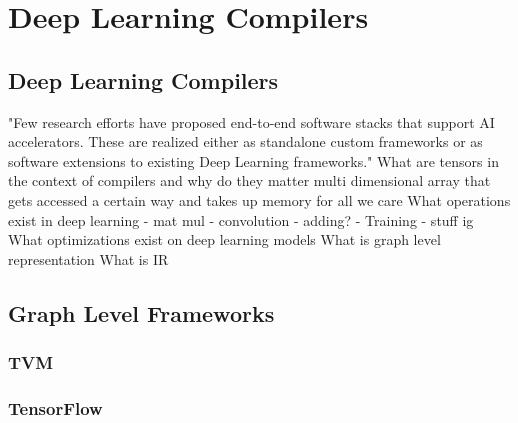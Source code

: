 
\chapter{Deep Learning Compilers} %

\label{Chapter2} %

\section{Deep Learning Compilers}

"Few research efforts have proposed end-to-end software stacks that support AI accelerators. 
These are realized either as standalone custom frameworks or as software extensions to existing Deep Learning
frameworks." \cite{onsram}
What are tensors in the context of compilers and why do they matter
	multi dimensional array that gets accessed a certain way and takes up memory for all we care
What operations exist in deep learning
- mat mul
- convolution
- adding?
- Training
- stuff ig
What optimizations exist on deep learning models
What is graph level representation
What is IR 



\section{Graph Level Frameworks}


\subsection{TVM}


\subsection{TensorFlow}

